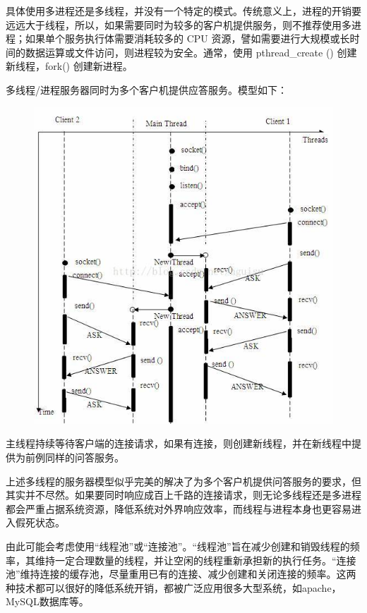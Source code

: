 \documentclass[UTF8,a4paper,12pt]{ctexbook}
\begin{document}
			具体使用多进程还是多线程，并没有一个特定的模式。传统意义上，进程的开销要远远大于线程，所以，如果需要同时为较多的客户机提供服务，则不推荐使用多进程；如果单个服务执行体需要消耗较多的 CPU 资源，譬如需要进行大规模或长时间的数据运算或文件访问，则进程较为安全。通常，使用 pthread\_create () 创建新线程，fork() 创建新进程。
			
			多线程/进程服务器同时为多个客户机提供应答服务。模型如下：
			\begin{figure}[h]
				\centering
				\includegraphics[scale = 0.8]{figures/MultiThread.jpg}
			\end{figure}
			
			主线程持续等待客户端的连接请求，如果有连接，则创建新线程，并在新线程中提供为前例同样的问答服务。
			
			上述多线程的服务器模型似乎完美的解决了为多个客户机提供问答服务的要求，但其实并不尽然。如果要同时响应成百上千路的连接请求，则无论多线程还是多进程都会严重占据系统资源，降低系统对外界响应效率，而线程与进程本身也更容易进入假死状态。
			
			由此可能会考虑使用“线程池”或“连接池”。“线程池”旨在减少创建和销毁线程的频率，其维持一定合理数量的线程，并让空闲的线程重新承担新的执行任务。“连接池”维持连接的缓存池，尽量重用已有的连接、减少创建和关闭连接的频率。这两种技术都可以很好的降低系统开销，都被广泛应用很多大型系统，如apache，MySQL数据库等。
			
\end{document}
